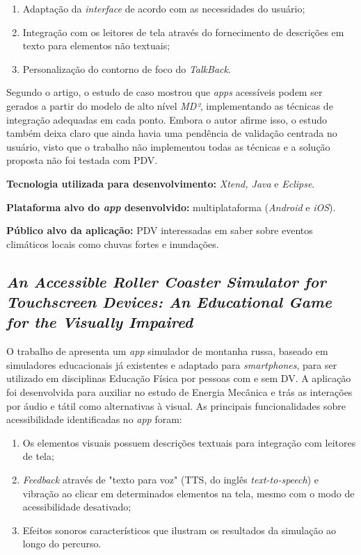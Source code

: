 \begin{enumerate}
\item Adaptação da \emph{interface} de acordo com as necessidades do usuário;
\item Integração com os leitores de tela através do fornecimento de descrições em texto para elementos não textuais;
\item Personalização do contorno de foco do \emph{TalkBack}.
\end{enumerate}

Segundo o artigo, o estudo de caso mostrou que \emph{apps} acessíveis podem ser gerados a partir do modelo de alto nível \emph{MD²}, implementando as técnicas de integração adequadas em cada ponto. Embora o autor afirme isso, o estudo também deixa claro que ainda havia uma pendência de validação centrada no usuário, visto que o trabalho não implementou todas as técnicas e a solução proposta não foi testada com PDV.

\textbf{Tecnologia utilizada para desenvolvimento:} \emph{Xtend, Java} e \emph{Eclipse}.

\textbf{Plataforma alvo do \emph{app} desenvolvido:} multiplataforma (\emph{Android} e \emph{iOS}).

\textbf{Público alvo da aplicação:} PDV interessadas em saber sobre eventos climáticos locais como chuvas fortes e inundações.

\subsection{\emph{An Accessible Roller Coaster Simulator for Touchscreen Devices: An Educational Game for the Visually Impaired}}

O trabalho de  apresenta um \emph{app} simulador de montanha russa, baseado em simuladores educacionais já existentes e adaptado para \emph{smartphones}, para ser utilizado em disciplinas Educação Física por pessoas com e sem DV. A aplicação foi desenvolvida para auxiliar no estudo de Energia Mecânica e trás as interações por áudio e tátil como alternativas à visual. As principais funcionalidades sobre acessibilidade identificadas no \emph{app} foram:

\begin{enumerate}
\item Os elementos visuais possuem descrições textuais para integração com leitores de tela;
\item \emph{Feedback} através de "texto para voz" (TTS, do inglês \emph{text-to-speech}) e vibração ao clicar em determinados elementos na tela, mesmo com o modo de acessibilidade desativado;
\item Efeitos sonoros característicos que ilustram os resultados da simulação ao longo do percurso.
\end{enumerate}

